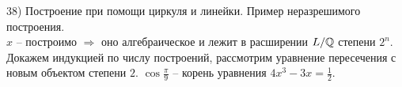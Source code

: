 38) Построение при помощи циркуля и линейки. Пример неразрешимого построения.\\
$x$ -- построимо $\Rightarrow$ оно алгебраическое и лежит в расширении $L/\mathbb{Q}$ степени $2^n$. Докажем индукцией по числу построений, рассмотрим уравнение пересечения с новым объектом степени $2$. $\cos \frac{\pi}{9}$ -- корень уравнения $4x^3 - 3x = \frac{1}{2}$.\\ 
